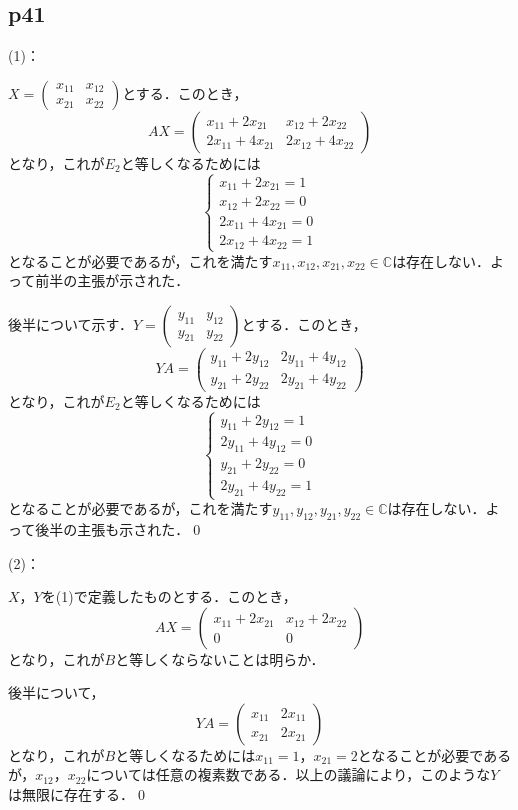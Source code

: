 \documentclass[dvipdfmx,uplatex,11pt]{jsarticle}
\theoremstyle{definition}
\begin{document}
\subsection{p41}
%
(1)：
\begin{leftbar}
    $ X =\begin{pmatrix} x_{11} & x_{12} \\ x_{21} & x_{22} \end{pmatrix}$とする．このとき，
    \[
        AX =\begin{pmatrix} x_{11}+2x_{21} &  x_{12}+2x_{22}  \\ 2x_{11} + 4x_{21} &2x_{12} + 4x_{22} \end{pmatrix}
    \]
    となり，これが$E_2$と等しくなるためには
    \[
        \begin{cases}
            x_{11}+2x_{21} =1 \\
            x_{12}+2x_{22}  =0 \\
            2x_{11} + 4x_{21}=0 \\
            2x_{12} + 4x_{22}=1
        \end{cases}
    \]
    となることが必要であるが，これを満たす$x_{11},x_{12},x_{21},x_{22} \in \mathbb{C}$は存在しない．よって前半の主張が示された．\par 
    後半について示す．$Y =\begin{pmatrix} y_{11} & y_{12} \\ y_{21} & y_{22} \end{pmatrix}$とする．このとき，
    \[
        YA = \begin{pmatrix} y_{11} +2y_{12} & 2y_{11}+4y_{12} \\ y_{21}+2y_{22} & 2y_{21}+4y_{22}  \end{pmatrix}
    \]
    となり，これが$E_2$と等しくなるためには
    \[
        \begin{cases}
            y_{11} +2y_{12}=1 \\
            2y_{11}+4y_{12}  =0 \\
            y_{21}+2y_{22} =0 \\
            2y_{21}+4y_{22} =1
        \end{cases}
    \]
    となることが必要であるが，これを満たす$y_{11},y_{12},y_{21},y_{22} \in \mathbb{C}$は存在しない．よって後半の主張も示された．\qed
    \end{leftbar}
%
    (2)：
    \begin{leftbar}
        $X$，$Y$を(1)で定義したものとする．このとき，
        \[
            AX = \begin{pmatrix} x_{11}+2x_{21} & x_{12}+2x_{22} \\ 0 & 0 \end{pmatrix}
        \]
        となり，これが$B$と等しくならないことは明らか．\par 
        後半について，
        \[
            YA =\begin{pmatrix} x_{11} & 2 x_{11} \\  x_{21}&  2x_{21} \end{pmatrix}
        \]
        となり，これが$B$と等しくなるためには$x_{11}=1$，$x_{21}=2$となることが必要であるが，$x_{12}$，$x_{22}$については任意の複素数である．以上の議論により，このような$Y$は無限に存在する．\qed
    \end{leftbar}
\end{document}
